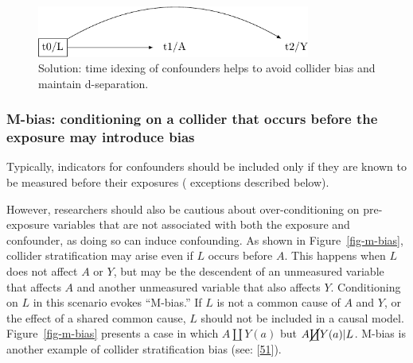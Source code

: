 \documentclass[
  singlecolumn]{article}
\begin{document}
\begin{figure}

{\centering \includegraphics[width=0.8\textwidth,height=\textheight]{causal-dags_files/figure-pdf/fig-dag-common-effect-solution-1.pdf}

}

\caption{\label{fig-dag-common-effect-solution}Solution: time idexing of
confounders helps to avoid collider bias and maintain d-separation.}

\end{figure}

\hypertarget{m-bias-conditioning-on-a-collider-that-occurs-before-the-exposure-may-introduce-bias}{%
\subsubsection{M-bias: conditioning on a collider that occurs before the
exposure may introduce
bias}\label{m-bias-conditioning-on-a-collider-that-occurs-before-the-exposure-may-introduce-bias}}

Typically, indicators for confounders should be included only if they
are known to be measured before their exposures ( exceptions described
below).

However, researchers should also be cautious about over-conditioning on
pre-exposure variables that are not associated with both the exposure
and confounder, as doing so can induce confounding. As shown in
Figure~\ref{fig-m-bias}, collider stratification may arise even if \(L\)
occurs before \(A\). This happens when \(L\) does not affect \(A\) or
\(Y\), but may be the descendent of an unmeasured variable that affects
\(A\) and another unmeasured variable that also affects \(Y\).
Conditioning on \(L\) in this scenario evokes ``M-bias.'' If \(L\) is
not a common cause of \(A\) and \(Y\), or the effect of a shared common
cause, \(L\) should not be included in a causal model.
Figure~\ref{fig-m-bias} presents a case in which \(A \coprod Y(a)\) but
\(A \cancel{\coprod} Y(a)| L\). M-bias is another example of collider
stratification bias (see: {[}\protect\hyperlink{ref-cole2010}{51}{]}).
\end{document}
